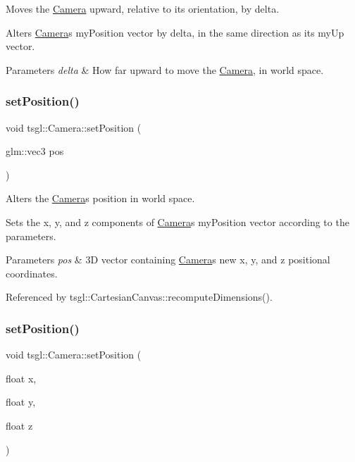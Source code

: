 Moves the \hyperlink{classtsgl_1_1_camera}{Camera} upward, relative to its orientation, by delta. 

Alters \hyperlink{classtsgl_1_1_camera}{Camera}\textquotesingle{}s my\+Position vector by delta, in the same direction as its my\+Up vector. 
\begin{DoxyParams}{Parameters}
{\em delta} & How far upward to move the \hyperlink{classtsgl_1_1_camera}{Camera}, in world space. \\
\hline
\end{DoxyParams}
\mbox{\label{classtsgl_1_1_camera_aeb5d5fb50a80951a307b03d66e56eb17}} 
\subsubsection{\texorpdfstring{set\+Position()}{setPosition()}\hspace{0.1cm}{\footnotesize\ttfamily [1/2]}}
{\footnotesize\ttfamily void tsgl\+::\+Camera\+::set\+Position (\begin{DoxyParamCaption}\item[{glm\+::vec3}]{pos }\end{DoxyParamCaption})}



Alters the \hyperlink{classtsgl_1_1_camera}{Camera}\textquotesingle{}s position in world space. 

Sets the x, y, and z components of \hyperlink{classtsgl_1_1_camera}{Camera}\textquotesingle{}s my\+Position vector according to the parameters. 
\begin{DoxyParams}{Parameters}
{\em pos} & 3D vector containing \hyperlink{classtsgl_1_1_camera}{Camera}\textquotesingle{}s new x, y, and z positional coordinates. \\
\hline
\end{DoxyParams}


Referenced by tsgl\+::\+Cartesian\+Canvas\+::recompute\+Dimensions().

\mbox{\label{classtsgl_1_1_camera_a6cb0b89abb559c839616c554554adfb4}} 
\subsubsection{\texorpdfstring{set\+Position()}{setPosition()}\hspace{0.1cm}{\footnotesize\ttfamily [2/2]}}
{\footnotesize\ttfamily void tsgl\+::\+Camera\+::set\+Position (\begin{DoxyParamCaption}\item[{float}]{x,  }\item[{float}]{y,  }\item[{float}]{z }\end{DoxyParamCaption})}



